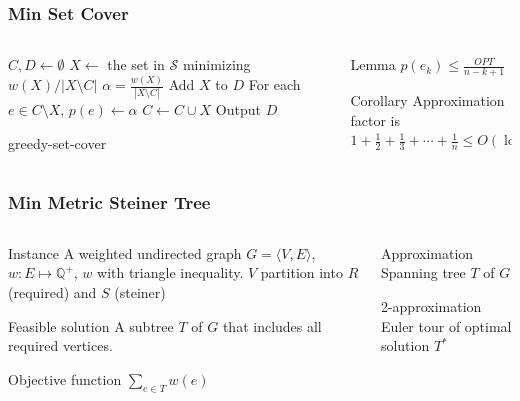 \documentclass[12pt,aspectratio=169]{beamer}
\begin{document}
\begin{frame}\frametitle{Min Set Cover }
\begin{columns} 
  \begin{column}{0.61\textwidth}
\begin{algorithm}[H]
  $C, D\gets \emptyset$\;
{
  $X\gets$ the set in $\mathcal{S}$ minimizing $w(X)/|X\setminus C|$\;
  $\alpha = \frac{w(X)}{|X\setminus C|}$\;
  Add $X$ to $D$\;
  For each $e\in C\setminus X$, $p(e)\gets \alpha$\;
  $C\gets C\cup X$
}
Output $D$
\caption{greedy-set-cover}
\end{algorithm}
\end{column}
  \begin{column}{0.34\textwidth}
\begin{block}{Lemma}
    $p(e_{k}) \le \frac{OPT}{n-k+1}$
  \end{block}
  \begin{block}{Corollary}
    Approximation factor is $1 + \frac{1}{2} + \frac{1}{3} + \cdots + \frac{1}{n} \le
    O(\log n)$
  \end{block}
\end{column}
\end{columns}
\end{frame}

\begin{frame}\frametitle{Min Metric Steiner Tree}
\begin{columns} 
  \begin{column}{0.48\textwidth}
  \begin{block}{Instance}
    A weighted undirected graph $G=\langle V,E \rangle$, $w:E\mapsto \mathbb{Q}^{+}$, $w$
    with triangle inequality.
%
    $V$ partition into $R$ (required) and $S$ (steiner)
  \end{block}
  \begin{block}{Feasible solution}
    A subtree $T$ of $G$ that includes all required vertices.
%
  \end{block}
  \begin{block}{Objective function}
    $\sum_{e\in T}w(e)$
  \end{block}
\end{column}
    \begin{column}{0.48\textwidth}
      \begin{block}{Approximation}
        Spanning tree $T$ of $G$
      \end{block}
      \begin{block}{2-approximation}
Euler tour of optimal solution $T^{*}$
      \end{block}
    \end{column}
\end{columns}
\end{frame}
\end{document}
